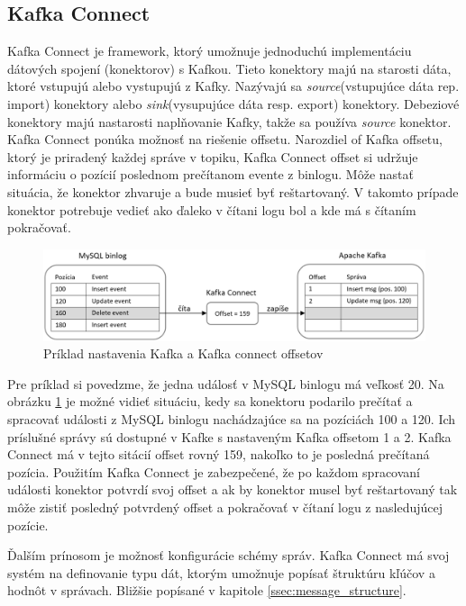 \subsection{Kafka Connect}\label{kafka_connect}
Kafka Connect je framework, ktorý umožnuje jednoduchú implementáciu dátových spojení (konektorov) s Kafkou. Tieto konektory majú na starosti dáta, ktoré vstupujú alebo vystupujú z Kafky. Nazývajú sa \textit{source}(vstupujúce dáta rep. import) konektory alebo \textit{sink}(vysupujúce dáta resp. export) konektory. Debeziové konektory majú nastarosti naplňovanie Kafky, takže sa používa \textit{source} konektor. Kafka Connect ponúka možnosť na riešenie offsetu. Narozdiel of Kafka offsetu, ktorý je priradený každej správe v topiku, Kafka Connect offset si udržuje informáciu o pozícií poslednom prečítanom evente z binlogu. Môže nastať situácia, že konektor zhvaruje a bude musieť byť reštartovaný. V takomto prípade konektor potrebuje vedieť ako ďaleko v čítani logu bol a kde má s čítaním pokračovať. 

\begin{figure}[H]
\begin{center}
\includegraphics[width=15cm]{figures/kafka_offsets.PNG}
\caption{Príklad nastavenia Kafka a Kafka connect offsetov}
\label{fig:kafka_offsets}
\end{center}
\end{figure}

Pre príklad si povedzme, že jedna událosť v MySQL binlogu má veľkosť 20. Na obrázku \ref{fig:kafka_offsets} je možné vidieť situáciu, kedy sa konektoru podarilo prečítať a spracovať události z MySQL binlogu nachádzajúce sa na pozíciách 100 a 120. Ich príslušné správy sú dostupné v Kafke s nastaveným Kafka offsetom 1 a 2. Kafka Connect má v tejto sitácií offset rovný 159, nakoľko to je posledná prečítaná pozícia. Použitím Kafka Connect je zabezpečené, že po každom spracovaní události konektor potvrdí svoj offset a ak by konektor musel byť reštartovaný tak môže zistiť posledný potvrdený offset a pokračovať v čítaní logu z nasledujúcej pozície.

Ďalším prínosom je možnosť konfigurácie schémy správ. Kafka Connect má svoj systém na definovanie typu dát, ktorým umožnuje popísať štruktúru kľúčov a hodnôt v správach. Bližšie popísané v kapitole \ref{ssec:message_structure}.

